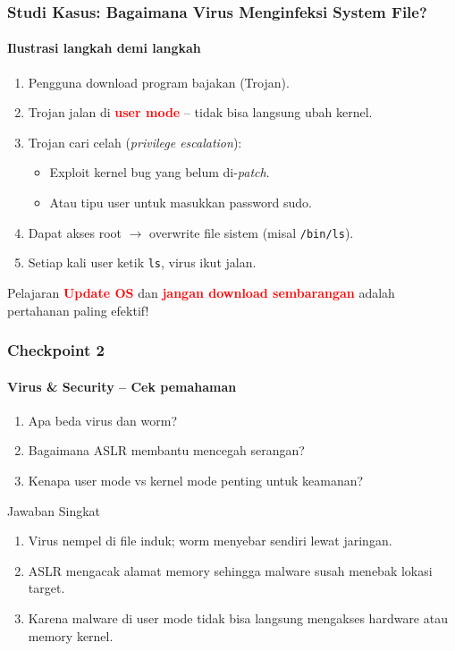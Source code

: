 \documentclass[t,aspectratio=169,xcolor=dvipsnames]{beamer}
\newcommand{\tem}[1]{\textbf{\textcolor{red}{#1}}}
\begin{document}
\begin{frame}[shrink=5]
    \frametitle{Studi Kasus: Bagaimana Virus Menginfeksi System File?}
    \framesubtitle{Ilustrasi langkah demi langkah}

    \small
    \begin{enumerate}
        \item Pengguna download program bajakan (Trojan).
        \item Trojan jalan di \tem{user mode} -- tidak bisa langsung ubah kernel.
        \item Trojan cari celah (\textit{privilege escalation}):
        \begin{itemize}
            \item Exploit kernel bug yang belum di-\textit{patch}.
            \item Atau tipu user untuk masukkan password sudo.
        \end{itemize}
        \item Dapat akses root $\to$ overwrite file sistem (misal \texttt{/bin/ls}).
        \item Setiap kali user ketik \texttt{ls}, virus ikut jalan.
    \end{enumerate}

    \vspace{0.2cm}
    \begin{alertblock}{Pelajaran}
        \small
        \tem{Update OS} dan \tem{jangan download sembarangan} adalah pertahanan paling efektif!
    \end{alertblock}
\end{frame}

\begin{frame}
    \frametitle{Checkpoint 2}
    \framesubtitle{Virus \& Security -- Cek pemahaman}
    \small
    \begin{enumerate}
        \item Apa beda virus dan worm?
        \item Bagaimana ASLR membantu mencegah serangan?
        \item Kenapa user mode vs kernel mode penting untuk keamanan?
    \end{enumerate}
    \vspace{0.3cm}
    \begin{block}{Jawaban Singkat}
        \begin{enumerate}
            \item Virus nempel di file induk; worm menyebar sendiri lewat jaringan.
            \item ASLR mengacak alamat memory sehingga malware susah menebak lokasi target.
            \item Karena malware di user mode tidak bisa langsung mengakses hardware atau memory kernel.
        \end{enumerate}
    \end{block}
\end{frame}
\end{document}
